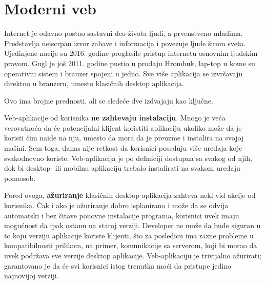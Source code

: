 \chapter{Moderni veb}

Internet je odavno postao sastavni deo života ljudi, a prvenstveno mladima.
Predstavlja neiscrpan izvor zabave i informacija i povezuje ljude širom sveta.
Ujedinjene nacije su 2016. godine proglasile pristup internetu osnovnim ljudskim pravom.
Gugl je još 2011. godine pustio u prodaju Hrombuk, lap-top u kome su operativni sistem i brauzer spojeni u jedno.
Sve više aplikacija se izvršavaju direktno u brauzeru, umesto klasičnih desktop aplikacija.

Ovo ima brojne prednosti, ali se sledeće dve izdvajaju kao ključne.

Veb-aplikacije od korisnika \textbf{ne zahtevaju instalaciju}.
Mnogo je veća verovatnoća da će potencijalni klijent koristiti aplikaciju ukoliko može da je koristi čim naide na nju, umesto da mora da je preuzme i instalira na svojoj mašini.
Sem toga, danas nije retkost da korisnici poseduju više uredaja koje svakodnevno koriste.
Veb-aplikacija je po definiciji dostupna sa svakog od njih, dok bi desktop- ili mobilnu aplikaciju trebalo instalirati na svakom uredaju ponaosob.

Pored ovoga, \textbf{ažuriranje} klasičnih desktop aplikacija zahteva neki vid akcije od korisnika.
Čak i ako je ažuriranje dobro isplanirano i može da se odvija automatski i bez čitave ponovne instalacije programa, korisnici uvek imaju mogućnost da ipak ostanu na staroj verziji.
Developer ne može da bude siguran u to koju verziju aplikacije koriste klijenti, što za posledicu ima razne probleme u kompatibilnosti prilikom, na primer, komunikacije sa serverom, koji bi morao da uvek podržava sve verzije desktop aplikacije.
Veb-aplikaciju je trivijalno ažurirati; garantovano je da će svi korisnici istog trenutka moći da pristupe jedino najnovijoj verziji.




